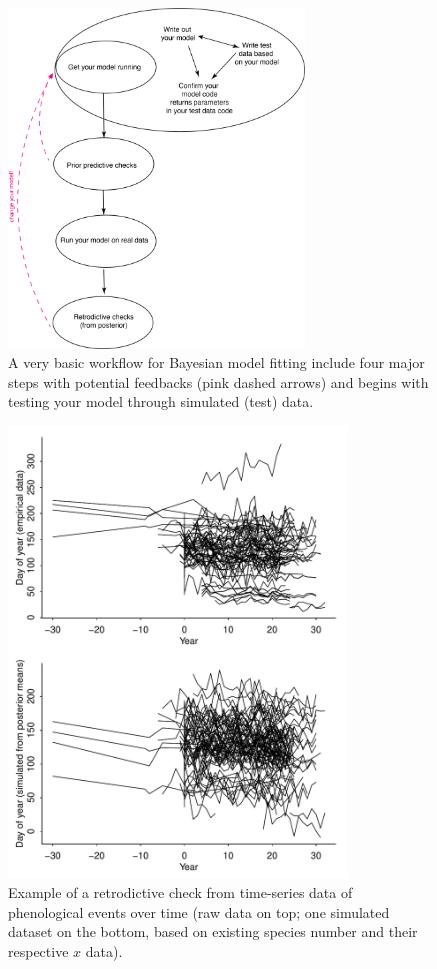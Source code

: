 \documentclass[11pt]{article}
\begin{document}
{\begin{figure}[ht]
\centering
\noindent \includegraphics[width=0.7\textwidth]{figures/workflow.png}
\caption{A very basic workflow for Bayesian model fitting include four major steps with potential feedbacks (pink dashed arrows) and begins with testing your model through simulated (test) data.}
\label{fig:workflow}
\end{figure}

\begin{figure}[ht]
\centering
\noindent \includegraphics[width=0.8\textwidth]{examples/synchrony/graphs/rawvsonepredictivecheck.pdf}
\caption{Example of a retrodictive check from time-series data of phenological events over time (raw data on top; one simulated dataset on the bottom, based on existing species number and their respective $x$ data).}
\label{fig:retrodictivecheck}
\end{figure}

}
\end{document}
